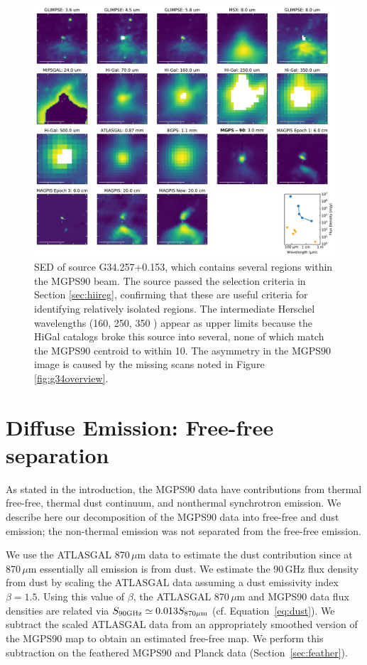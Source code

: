 \documentclass[twocolumn]{aastex62}
\newcommand{\MGPS}{MGPS90\xspace}
\begin{document}
\begin{figure}[htp]
\includegraphics[width=17cm]{figures/SED_plot_G34_G34.257+0.153.pdf}
\caption{SED of source G34.257+0.153, which contains several \hchii regions
within the MGPS90 beam.  The source passed the selection criteria in Section
\ref{sec:hiireg}, confirming that these are useful criteria for identifying
relatively isolated \hchii regions. The intermediate Herschel wavelengths (160,
250, 350 \um) appear as upper limits because the HiGal catalogs broke this
source into several, none of which match the MGPS90 centroid to within
10\arcsec.  The asymmetry in the \MGPS image is caused by the missing
scans noted in Figure \ref{fig:g34overview}.}
\label{fig:g34hchii}
\end{figure}


\section{Diffuse Emission: Free-free separation}
\label{sec:freefree}
As stated in the introduction, the MGPS90 data have contributions from thermal
free-free, thermal dust continuum, and nonthermal synchrotron emission.  We
describe here our decomposition of the MGPS90 data into free-free and dust
emission; the non-thermal emission was not separated from the free-free
emission.


We use the ATLASGAL 870\,$\mu$m data \citep{Schuller2009a} to estimate the dust
contribution since at 870\,$\mu$m essentially all emission is from dust.  We
estimate the 90\,GHz flux density from dust by scaling the ATLASGAL data
assuming a dust emissivity index $\beta=1.5$.  Using this value of $\beta$, the
ATLASGAL 870\,$\mu$m and MGPS90 data flux densities are related via $S_{\rm
90GHz} \simeq 0.013 S_{\rm 870\mu m}$ (cf. Equation~\ref{eq:dust}).  We
subtract the scaled ATLASGAL data from an appropriately smoothed version of the
MGPS90 map to obtain an estimated free-free map.  We perform this subtraction
on the feathered MGPS90 and Planck data (Section~\ref{sec:feather}).
\end{document}

